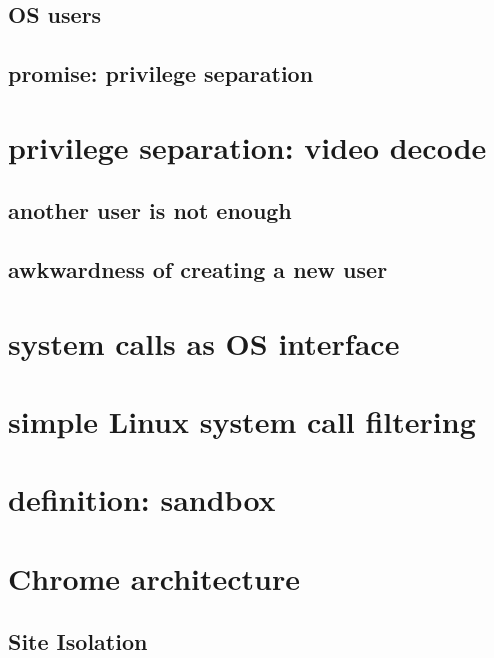 \subsection{OS users}


\subsection{promise: privilege separation}


\section{privilege separation: video decode}


\subsection{another user is not enough}


\subsection{awkwardness of creating a new user}


\section{system calls as OS interface}


\section{simple Linux system call filtering}


\section{definition: sandbox}


\section{Chrome architecture}


\subsection{Site Isolation}


